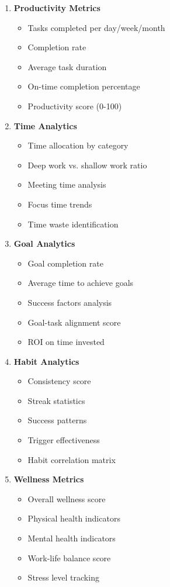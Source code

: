 \begin{enumerate}
    \item \textbf{Productivity Metrics}
    \begin{itemize}
        \item Tasks completed per day/week/month
        \item Completion rate
        \item Average task duration
        \item On-time completion percentage
        \item Productivity score (0-100)
    \end{itemize}
    
    \item \textbf{Time Analytics}
    \begin{itemize}
        \item Time allocation by category
        \item Deep work vs. shallow work ratio
        \item Meeting time analysis
        \item Focus time trends
        \item Time waste identification
    \end{itemize}
    
    \item \textbf{Goal Analytics}
    \begin{itemize}
        \item Goal completion rate
        \item Average time to achieve goals
        \item Success factors analysis
        \item Goal-task alignment score
        \item ROI on time invested
    \end{itemize}
    
    \item \textbf{Habit Analytics}
    \begin{itemize}
        \item Consistency score
        \item Streak statistics
        \item Success patterns
        \item Trigger effectiveness
        \item Habit correlation matrix
    \end{itemize}
    
    \item \textbf{Wellness Metrics}
    \begin{itemize}
        \item Overall wellness score
        \item Physical health indicators
        \item Mental health indicators
        \item Work-life balance score
        \item Stress level tracking
    \end{itemize}
\end{enumerate}

